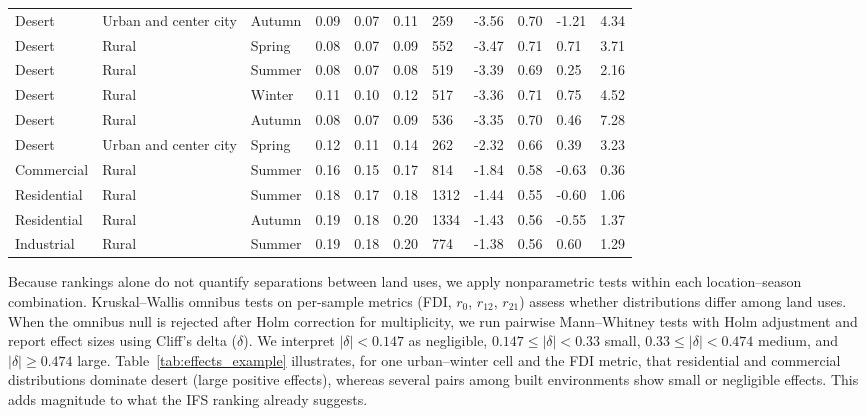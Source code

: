 \documentclass[a4paper,fleqn]{cas-sc}
\begin{document}
\begin{table}[htb]
\begin{tabular}{lllllllllll}
\hline
Desert & Urban and center city & Autumn & 0.09 & 0.07 & 0.11 & 259 & -3.56 & 0.70 & -1.21 & 4.34 \\
Desert & Rural & Spring & 0.08 & 0.07 & 0.09 & 552 & -3.47 & 0.71 & 0.71 & 3.71 \\
Desert & Rural & Summer & 0.08 & 0.07 & 0.08 & 519 & -3.39 & 0.69 & 0.25 & 2.16 \\
Desert & Rural & Winter & 0.11 & 0.10 & 0.12 & 517 & -3.36 & 0.71 & 0.75 & 4.52 \\
Desert & Rural & Autumn & 0.08 & 0.07 & 0.09 & 536 & -3.35 & 0.70 & 0.46 & 7.28 \\
Desert & Urban and center city & Spring & 0.12 & 0.11 & 0.14 & 262 & -2.32 & 0.66 & 0.39 & 3.23 \\
Commercial & Rural & Summer & 0.16 & 0.15 & 0.17 & 814 & -1.84 & 0.58 & -0.63 & 0.36 \\
Residential & Rural & Summer & 0.18 & 0.17 & 0.18 & 1312 & -1.44 & 0.55 & -0.60 & 1.06 \\
Residential & Rural & Autumn & 0.19 & 0.18 & 0.20 & 1334 & -1.43 & 0.56 & -0.55 & 1.37 \\
Industrial & Rural & Summer & 0.19 & 0.18 & 0.20 & 774 & -1.38 & 0.56 & 0.60 & 1.29  \\
\hline
\end{tabular}
\end{table}

Because rankings alone do not quantify separations between land uses, we apply nonparametric tests within each location--season combination. Kruskal--Wallis omnibus tests on per-sample metrics (FDI, $r_0$, $r_{12}$, $r_{21}$) assess whether distributions differ among land uses. When the omnibus null is rejected after Holm correction for multiplicity, we run pairwise Mann--Whitney tests with Holm adjustment and report effect sizes using Cliff’s delta ($\delta$). We interpret $|\delta|<0.147$ as negligible, $0.147\le|\delta|<0.33$ small, $0.33\le|\delta|<0.474$ medium, and $|\delta|\ge0.474$ large. Table~\ref{tab:effects_example} illustrates, for one urban--winter cell and the FDI metric, that residential and commercial distributions dominate desert (large positive effects), whereas several pairs among built environments show small or negligible effects. This adds magnitude to what the IFS ranking already suggests.
\end{document}
